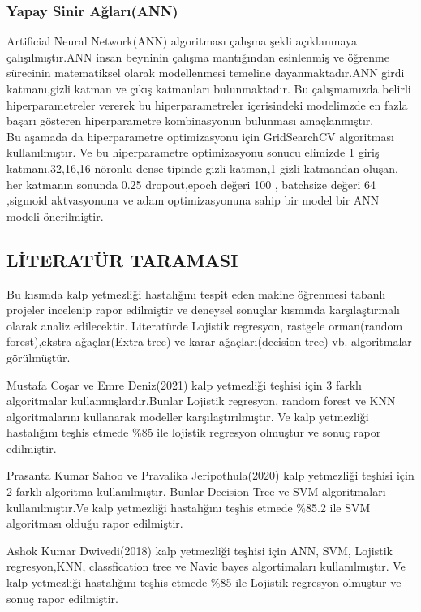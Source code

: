\documentclass[conference]{IEEEtran}
\begin{document}
\subsubsection{Yapay Sinir Ağları(ANN)}
Artificial Neural Network(ANN) algoritması çalışma şekli açıklanmaya çalışılmıştır.ANN insan beyninin çalışma mantığından esinlenmiş ve öğrenme sürecinin matematiksel olarak modellenmesi temeline dayanmaktadır.ANN girdi katmanı,gizli katman ve çıkış katmanları bulunmaktadır.
Bu çalışmamızda belirli hiperparametreler vererek bu hiperparametreler içerisindeki modelimzde en fazla başarı gösteren hiperparametre kombinasyonun bulunması amaçlanmıştır.\\
Bu aşamada da hiperparametre optimizasyonu için GridSearchCV algoritması kullanılmıştır. Ve bu hiperparametre optimizasyonu sonucu elimizde 1 giriş katmanı,32,16,16 nöronlu dense tipinde gizli katman,1 gizli katmandan oluşan, her katmanın sonunda 0.25 dropout,epoch değeri 100 , batchsize değeri 64 ,sigmoid aktvasyonuna ve adam optimizasyonuna sahip bir model bir ANN modeli önerilmiştir.

\subsection{LİTERATÜR TARAMASI}
Bu kısımda kalp yetmezliği hastalığını tespit eden makine öğrenmesi tabanlı projeler incelenip rapor edilmiştir ve deneysel sonuçlar kısmında karşılaştırmalı olarak analiz edilecektir. Literatürde Lojistik regresyon, rastgele orman(random forest),ekstra ağaçlar(Extra tree) ve karar ağaçları(decision tree) vb.
algoritmalar görülmüştür.

Mustafa Coşar ve Emre Deniz(2021) kalp yetmezliği teşhisi için 3 farklı algoritmalar kullanmışlardır.Bunlar Lojistik regresyon, random forest ve KNN algoritmalarını kullanarak modeller karşılaştırılmıştır. Ve kalp yetmezliği hastalığını teşhis etmede \%85 ile lojistik regresyon olmuştur ve sonuç rapor edilmiştir.

Prasanta Kumar Sahoo ve Pravalika Jeripothula(2020) kalp yetmezliği teşhisi için 2 farklı algoritma kullanılmıştır. Bunlar Decision Tree ve SVM algoritmaları kullanılmıştır.Ve kalp yetmezliği hastalığını teşhis etmede \%85.2 ile SVM algoritması olduğu rapor edilmiştir.

Ashok Kumar Dwivedi(2018) kalp yetmezliği teşhisi için ANN, SVM, Lojistik regresyon,KNN, classfication tree ve Navie bayes algortimaları kullanılmıştır. Ve kalp yetmezliği hastalığını teşhis etmede \%85 ile Lojistik regresyon olmuştur ve sonuç rapor edilmiştir.
\end{document}
